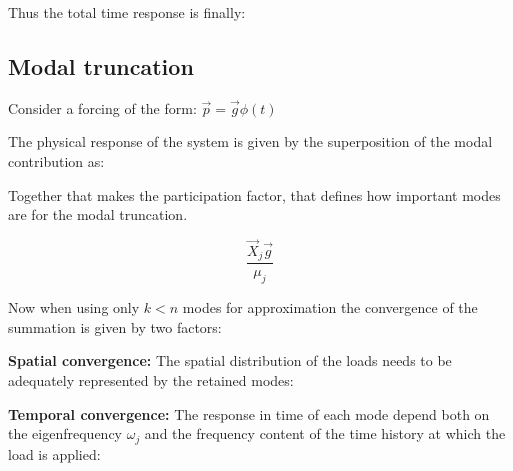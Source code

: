 \documentclass[10pt,a4paper]{scrartcl}
\begin{document}
\begin{multicols*}{2}


Thus the total time response is finally:


\subsection{Modal truncation}

Consider a forcing of the form: $\vec{p}=\vec{g}\phi(t)$

The physical response of the system is given by the superposition of the modal contribution as:



Together that makes the participation factor, that defines how important modes are for the modal truncation.

\begin{equation*}
\frac{\vec{X}_j\vec{g}}{\mu_j}
\end{equation*}

Now when using only $k<n$ modes for approximation the convergence of the summation is given by two factors:

\vspace{3ex}

\textbf{Spatial convergence:} The spatial distribution of the loads needs to be adequately represented by the retained modes:


\textbf{Temporal convergence:} The response in time of each mode depend both on the eigenfrequency $\omega_j$ and the frequency content of the time history at which the load is applied:


\end{multicols*}
\end{document}
